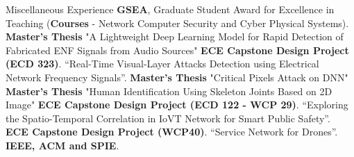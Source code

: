 \begin{rubric}{Miscellaneous Experience}
\entry*[2020] \textbf{GSEA}, Graduate Student Award for Excellence in Teaching (\textbf{Courses} - Network Computer Security and Cyber Physical Systems).
%
\entry*[2023-2024] \textbf{Master's Thesis} "A Lightweight Deep Learning Model for Rapid Detection of Fabricated ENF Signals from Audio Sources"
\entry*[2022-2023] \textbf{ECE Capstone Design Project (ECD 323)}. “Real-Time Visual-Layer Attacks
Detection using Electrical Network Frequency Signals”.
\entry*[2019-2020] \textbf{Master's Thesis} "Critical Pixels Attack on DNN"
\entry*[2019-2020] \textbf{Master's Thesis} "Human Identification Using Skeleton Joints Based on 2D Image"
\entry*[2019-2021] \textbf{ECE Capstone Design Project (ECD 122 - WCP 29)}. “Exploring the Spatio-Temporal Correlation in IoVT Network for Smart Public Safety”.
\entry*[2018-2019] \textbf{ECE Capstone Design Project (WCP40)}. “Service Network for Drones”.
%
\entry*[] \textbf{IEEE, ACM and SPIE}.
%
\end{rubric}
